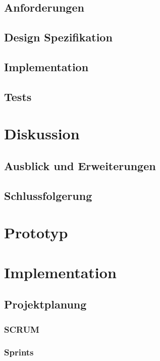 \documentclass[a4paper,twopage,ngerman,11pt]{scrreprt}
\begin{document}
		\chapter{Anforderungen}
		\chapter{Design Spezifikation}
		\chapter{Implementation}
		\chapter{Tests}

	\part{Diskussion}
		\chapter{Ausblick und Erweiterungen}
		\chapter{Schlussfolgerung}

	\part{Prototyp}
	

	\part{Implementation}
	


	\makeglossaries

	
	{}
	

	\chapter{Projektplanung}
		\section{SCRUM}
		\section{Sprints}
\end{document}
